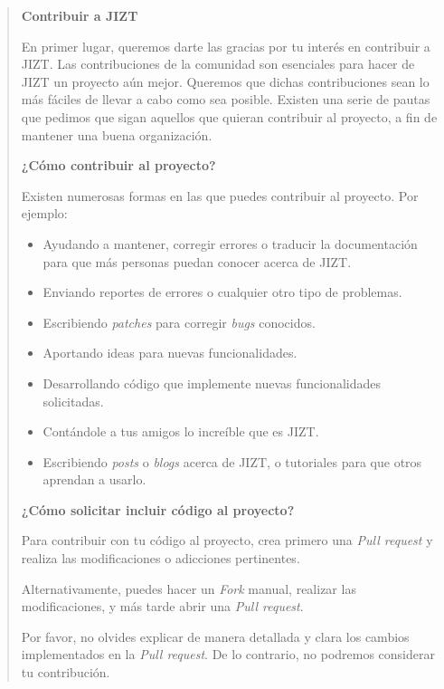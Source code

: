 \begin{quote}
	\textbf{Contribuir a JIZT}
	
	En primer lugar, queremos darte las gracias por tu interés en
	contribuir a JIZT. Las contribuciones de la comunidad son esenciales
	para hacer de JIZT un proyecto aún mejor. Queremos que dichas
	contribuciones sean lo más fáciles de llevar a cabo como sea posible.
	Existen una serie de pautas que pedimos que sigan aquellos que quieran
	contribuir al proyecto, a fin de mantener una buena organización.
	
	\medskip
	\textbf{¿Cómo contribuir al proyecto?}
	
	
	Existen numerosas formas en las que puedes contribuir al proyecto. Por ejemplo:
	
	\vspace{-0.2cm}
	\begin{itemize} [\textbullet]
		\item Ayudando a mantener, corregir errores o traducir la documentación para que más personas puedan conocer acerca de JIZT.
	
		\item Enviando reportes de errores o cualquier otro tipo de problemas.
	
		\item Escribiendo \emph{patches} para corregir \emph{bugs} conocidos.
	
 		\item Aportando ideas para nuevas funcionalidades.
	
		\item Desarrollando código que implemente nuevas funcionalidades solicitadas.
	
		\item Contándole a tus amigos lo increíble que es JIZT.
	
		\item Escribiendo \emph{posts} o \emph{blogs} acerca de JIZT, o tutoriales para que otros aprendan a usarlo.
	\end{itemize}
	
	\medskip
	\textbf{¿Cómo solicitar incluir código al proyecto?}
	
	Para contribuir con tu código al proyecto, crea primero una \emph{Pull request} y
	realiza las modificaciones o adicciones pertinentes.
	
	Alternativamente, puedes hacer un \emph{Fork} manual, realizar las modificaciones,
	y más tarde abrir una \emph{Pull request}.
	
	Por favor, no olvides explicar de manera detallada y clara los cambios
	implementados en la \emph{Pull request}. De lo contrario, no podremos considerar
	tu contribución.
	

\end{quote}
